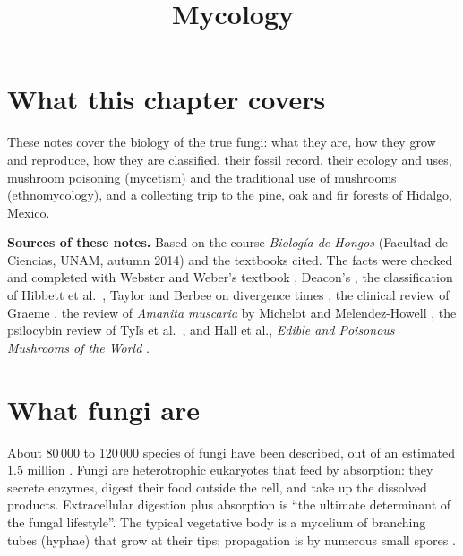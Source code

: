 



\title{Mycology}
\maketitle

\label{section-phantom}

\tableofcontents

\section{What this chapter covers}
\label{section-overview}

These notes cover the biology of the true
fungi: what they are, how they grow and
reproduce, how they are classified, their
fossil record, their ecology and uses,
mushroom poisoning (mycetism) and the
traditional use of mushrooms
(ethnomycology), and a collecting trip to
the pine, oak and fir forests of Hidalgo,
Mexico.

\textbf{Sources of these notes.}
Based on the course \emph{Biolog\'ia
de Hongos} (Facultad de Ciencias, UNAM,
autumn 2014) and the textbooks cited.
The facts were checked and
completed with Webster and Weber's
textbook \cite{webster2007fungi},
Deacon's \cite{deacon2006fungal}, the
classification of Hibbett et
al.\ \cite{hibbett2007higher}, Taylor and
Berbee on divergence times
\cite{taylor2006dating}, the clinical review
of Graeme \cite{graeme2014mycetism}, the
review of \emph{Amanita muscaria} by Michelot
and Melendez-Howell
\cite{michelot2003amanita}, the psilocybin
review of Ty\v{l}s et al.\
\cite{tyls2014psilocybin}, and Hall et al.,
\emph{Edible and Poisonous Mushrooms of the
World} \cite{hall2003edible}.

\section{What fungi are}
\label{section-what-fungi-are}

About 80\,000 to 120\,000 species of fungi
have been described, out of an estimated
1.5 million
\cite[Section 1.1]{webster2007fungi}.
Fungi are heterotrophic eukaryotes that feed
by absorption: they secrete enzymes, digest
their food outside the cell, and take up the
dissolved products. Extracellular digestion
plus absorption is ``the ultimate
determinant of the fungal lifestyle''. The
typical vegetative body is a mycelium of
branching tubes (hyphae) that grow at their
tips; propagation is by numerous small
spores
\cite[Section 1.1]{webster2007fungi}.

